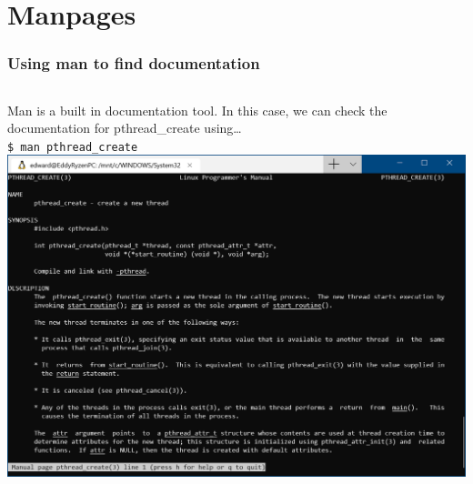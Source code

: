 \documentclass{beamer}
\begin{document}
\section{Manpages}
\begin{frame}
  \frametitle{Using man to find documentation}
  \begin{columns}[c]
      Man is a built in documentation tool. In this case, we can check the documentation for pthread\_create using\dots\\
      \texttt{\$ man pthread\_create}
      \includegraphics[width=\textwidth,height=\textheight,keepaspectratio]{pthreadmanpage.png}
  \end{columns}
\end{frame}
\end{document}
